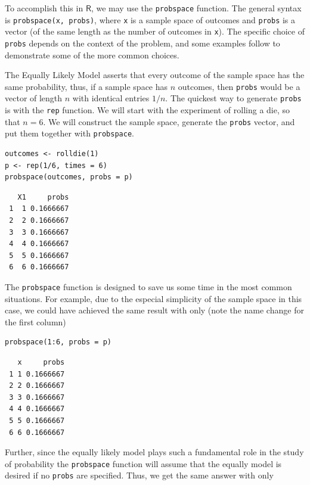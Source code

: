 \documentclass[captions=tableheading]{scrbook}
\begin{document}
To accomplish this in \(\mathsf{R}\), we may use the \texttt{probspace} function. The general syntax is \texttt{probspace(x, probs)}, where \texttt{x} is a sample space of outcomes and \texttt{probs} is a vector (of the same length as the number of outcomes in \texttt{x}). The specific choice of \texttt{probs} depends on the context of the problem, and some examples follow to demonstrate some of the more common choices. 

\begin{example}
The Equally Likely Model asserts that every outcome of the sample space has the same probability, thus, if a sample space has \(n\) outcomes, then \texttt{probs} would be a vector of length \(n\) with identical entries \(1/n\). The quickest way to generate \texttt{probs} is with the \texttt{rep} function. We will start with the experiment of rolling a die, so that \(n=6\). We will construct the sample space, generate the \texttt{probs} vector, and put them together with \texttt{probspace}. 


\begin{verbatim}
outcomes <- rolldie(1) 
p <- rep(1/6, times = 6) 
probspace(outcomes, probs = p)
\end{verbatim}

\begin{verbatim}
   X1     probs
 1  1 0.1666667
 2  2 0.1666667
 3  3 0.1666667
 4  4 0.1666667
 5  5 0.1666667
 6  6 0.1666667
\end{verbatim}

The \texttt{probspace} function is designed to save us some time in the most common situations. For example, due to the especial simplicity of the sample space in this case, we could have achieved the same result with only (note the name change for the first column) 


\begin{verbatim}
probspace(1:6, probs = p)
\end{verbatim}

\begin{verbatim}
   x     probs
 1 1 0.1666667
 2 2 0.1666667
 3 3 0.1666667
 4 4 0.1666667
 5 5 0.1666667
 6 6 0.1666667
\end{verbatim}

Further, since the equally likely model plays such a fundamental role in the study of probability the \texttt{probspace} function will assume that the equally model is desired if no \texttt{probs} are specified. Thus, we get the same answer with only 



\end{example}
\end{document}
